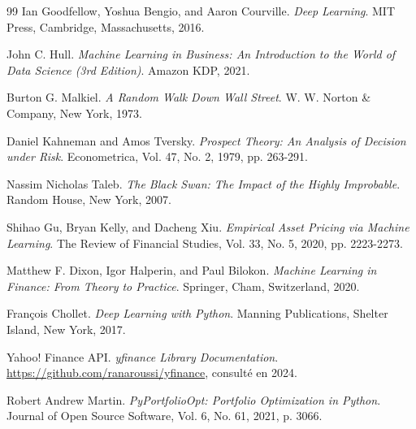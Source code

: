 \begin{thebibliography}{99}
Ian Goodfellow, Yoshua Bengio, and Aaron Courville.
\textit{Deep Learning}.
MIT Press, Cambridge, Massachusetts, 2016.

John C. Hull.
\textit{Machine Learning in Business: An Introduction to the World of Data Science (3rd Edition)}.
Amazon KDP, 2021.

Burton G. Malkiel.
\textit{A Random Walk Down Wall Street}.
W. W. Norton \& Company, New York, 1973.

Daniel Kahneman and Amos Tversky.
\textit{Prospect Theory: An Analysis of Decision under Risk}.
Econometrica, Vol. 47, No. 2, 1979, pp. 263-291.

Nassim Nicholas Taleb.
\textit{The Black Swan: The Impact of the Highly Improbable}.
Random House, New York, 2007.

Shihao Gu, Bryan Kelly, and Dacheng Xiu.
\textit{Empirical Asset Pricing via Machine Learning}.
The Review of Financial Studies, Vol. 33, No. 5, 2020, pp. 2223-2273.

Matthew F. Dixon, Igor Halperin, and Paul Bilokon.
\textit{Machine Learning in Finance: From Theory to Practice}.
Springer, Cham, Switzerland, 2020.

François Chollet.
\textit{Deep Learning with Python}.
Manning Publications, Shelter Island, New York, 2017.

Yahoo! Finance API.
\textit{yfinance Library Documentation}.
\url{https://github.com/ranaroussi/yfinance}, consulté en 2024.

Robert Andrew Martin.
\textit{PyPortfolioOpt: Portfolio Optimization in Python}.
Journal of Open Source Software, Vol. 6, No. 61, 2021, p. 3066.

\end{thebibliography}
